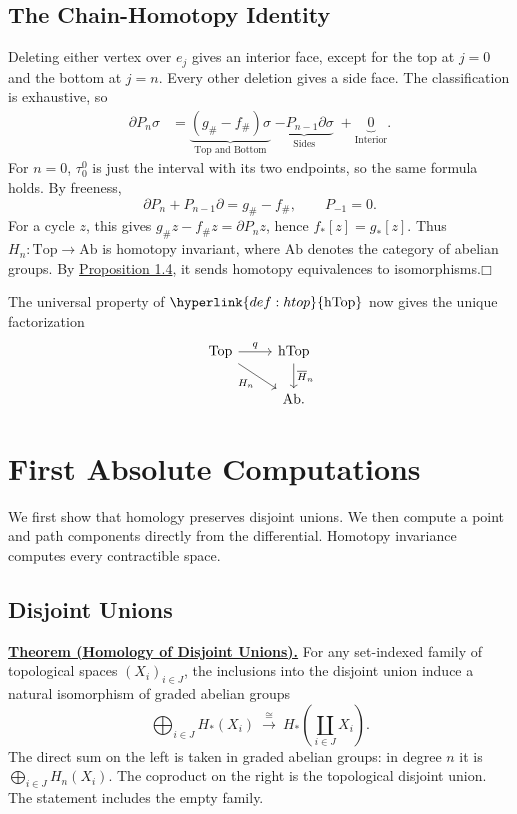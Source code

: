 \documentclass[11pt]{article}
\newcommand{\coursebold}[1]{{\color{burgundy}\textbf{#1}}}
\newcommand{\facehead}[1]{\subsection{#1}}
\begin{document}
\facehead{The Chain-Homotopy Identity}
Deleting either vertex over $e_j$ gives an interior face, except for the top at $j=0$ and the bottom at $j=n$. Every other deletion gives a side face. The classification is exhaustive, so
\[
\begin{aligned}
\partial P_n\sigma
&=\underbrace{(g_\#-f_\#)\sigma}_{\text{Top and Bottom}}
\;\underbrace{-P_{n-1}\partial\sigma}_{\text{Sides}}
\;+\underbrace{0}_{\text{Interior}}.
\end{aligned}
\]
For $n=0$, $\tau_0^0$ is just the interval with its two endpoints, so the same formula holds. By freeness,
\begin{equation}\label{eq:chain-homotopy}
\partial P_n+P_{n-1}\partial=g_\#-f_\#,\qquad P_{-1}=0.\tag{1}
\end{equation}
For a cycle $z$, this gives $g_\#z-f_\#z=\partial P_nz$, hence $f_*[z]=g_*[z]$. Thus $H_n:\mathrm{Top}\to\mathrm{Ab}$ is homotopy invariant, where $\mathrm{Ab}$ denotes the category of abelian groups. By \hyperlink{prop:homotopy-invariant}{Proposition 1.4}, it sends homotopy equivalences to isomorphisms.\hfill$\mdlgwhtsquare$


The universal property of $\hyperlink{def:htop}{\mathrm{hTop}}$ now gives the unique factorization
\[
\begin{tikzcd}
\mathrm{Top}\arrow[r,"q"]\arrow[dr,"H_n"']&\mathrm{hTop}\arrow[d,"\overline H_n"]\\
&\mathrm{Ab}.
\end{tikzcd}
\]

\section{First Absolute Computations}
We first show that homology preserves disjoint unions. We then compute a point and path components directly from the differential. Homotopy invariance computes every contractible space.

\facehead{Disjoint Unions}
\hypertarget{disjoint-theorem}{}\coursebold{\hyperlink{disjoint-proof}{Theorem (Homology of Disjoint Unions).}} For any set-indexed family of topological spaces $(X_i)_{i\in J}$, the inclusions into the disjoint union induce a natural isomorphism of graded abelian groups
\[
\bigoplus_{i\in J}H_*(X_i)\ \xrightarrow{\ \cong\ }\ H_*\!\left(\coprod_{i\in J}X_i\right).
\]
The direct sum on the left is taken in graded abelian groups: in degree $n$ it is $\bigoplus_{i\in J}H_n(X_i)$. The coproduct on the right is the topological disjoint union. The statement includes the empty family.
\end{document}
